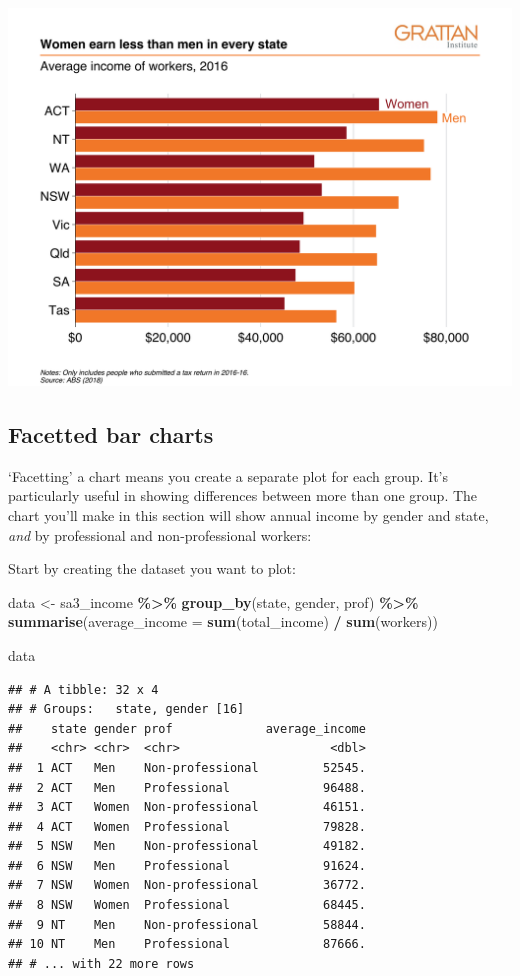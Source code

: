 \documentclass[
]{book}
\newenvironment{Shaded}{\begin{snugshade}}{\end{snugshade}}
\newcommand{\DataTypeTok}[1]{\textcolor[rgb]{0.13,0.29,0.53}{#1}}
\newcommand{\KeywordTok}[1]{\textcolor[rgb]{0.13,0.29,0.53}{\textbf{#1}}}
\newcommand{\NormalTok}[1]{#1}
\newcommand{\OperatorTok}[1]{\textcolor[rgb]{0.81,0.36,0.00}{\textbf{#1}}}
\newcommand{\StringTok}[1]{\textcolor[rgb]{0.31,0.60,0.02}{#1}}
\begin{document}
\includegraphics[width=44.44in]{atlas/multiple_bar}

\hypertarget{facet-bar}{%
\subsection{Facetted bar charts}\label{facet-bar}}

`Facetting' a chart means you create a separate plot for each group. It's particularly useful in showing differences between more than one group. The chart you'll make in this section will show annual income by gender and state, \emph{and} by professional and non-professional workers:

Start by creating the dataset you want to plot:

\begin{Shaded}
\begin{Highlighting}[]
\NormalTok{data \textless{}{-}}\StringTok{ }\NormalTok{sa3\_income }\OperatorTok{\%\textgreater{}\%}\StringTok{ }
\StringTok{  }\KeywordTok{group\_by}\NormalTok{(state, gender, prof) }\OperatorTok{\%\textgreater{}\%}\StringTok{ }
\StringTok{  }\KeywordTok{summarise}\NormalTok{(}\DataTypeTok{average\_income =} \KeywordTok{sum}\NormalTok{(total\_income) }\OperatorTok{/}\StringTok{ }\KeywordTok{sum}\NormalTok{(workers))}

\NormalTok{data}
\end{Highlighting}
\end{Shaded}

\begin{verbatim}
## # A tibble: 32 x 4
## # Groups:   state, gender [16]
##    state gender prof             average_income
##    <chr> <chr>  <chr>                     <dbl>
##  1 ACT   Men    Non-professional         52545.
##  2 ACT   Men    Professional             96488.
##  3 ACT   Women  Non-professional         46151.
##  4 ACT   Women  Professional             79828.
##  5 NSW   Men    Non-professional         49182.
##  6 NSW   Men    Professional             91624.
##  7 NSW   Women  Non-professional         36772.
##  8 NSW   Women  Professional             68445.
##  9 NT    Men    Non-professional         58844.
## 10 NT    Men    Professional             87666.
## # ... with 22 more rows
\end{verbatim}
\end{document}
